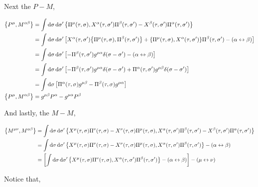 Next the $P-M$,

\begin{align*}
    \acomm{P^\mu}{M^{\alpha\beta}}&=\int\dd{\sigma}\dd{\sigma'}\acomm{\Pi^\mu\qty(\tau,\sigma)}{X^\alpha\qty(\tau,\sigma')\Pi^\beta\qty(\tau,\sigma')-X^\beta\qty(\tau,\sigma')\Pi^\alpha\qty(\tau,\sigma')}\\
    &=\int\dd{\sigma}\dd{\sigma'}\qty[X^\alpha\qty(\tau,\sigma')\acomm{\Pi^\mu\qty(\tau,\sigma)}{\Pi^\beta\qty(\tau,\sigma')}+\acomm{\Pi^\mu\qty(\tau,\sigma)}{X^\alpha\qty(\tau,\sigma')}\Pi^\beta\qty(\tau,\sigma')-\qty(\alpha\leftrightarrow\beta)]\\
    &=\int\dd{\sigma}\dd{\sigma'}\qty[-\Pi^\beta\qty(\tau,\sigma')g^{\mu\alpha}\delta\qty(\sigma-\sigma')-\qty(\alpha\leftrightarrow\beta)]\\
    &=\int\dd{\sigma}\dd{\sigma'}\qty[-\Pi^\beta\qty(\tau,\sigma')g^{\mu\alpha}\delta\qty(\sigma-\sigma')+\Pi^\alpha\qty(\tau,\sigma')g^{\mu\beta}\delta\qty(\sigma-\sigma')]\\
    &=\int\dd{\sigma}\qty[\Pi^\alpha\qty(\tau,\sigma)g^{\mu\beta}-\Pi^\beta\qty(\tau,\sigma)g^{\mu\alpha}]\\
    \acomm{P^\mu}{M^{\alpha\beta}}&=g^{\mu\beta}P^\alpha -g^{\mu\alpha}P^\beta 
\end{align*}

And lastly, the $M-M$,

\begin{align*}
    \acomm{M^{\mu\nu}}{M^{\alpha\beta}}&=\int\dd{\sigma}\dd{\sigma'}\acomm{X^\mu\qty(\tau,\sigma)\Pi^\nu\qty(\tau,\sigma)-X^\nu\qty(\tau,\sigma)\Pi^\mu\qty(\tau,\sigma)}{X^\alpha\qty(\tau,\sigma')\Pi^\beta\qty(\tau,\sigma')-X^\beta\qty(\tau,\sigma')\Pi^\alpha\qty(\tau,\sigma')}\\
    &=\int\dd{\sigma}\dd{\sigma'}\acomm{X^\mu\qty(\tau,\sigma)\Pi^\nu\qty(\tau,\sigma)-X^\nu\qty(\tau,\sigma)\Pi^\mu\qty(\tau,\sigma)}{X^\alpha\qty(\tau,\sigma')\Pi^\beta\qty(\tau,\sigma')}-\qty(\alpha\leftrightarrow\beta)\\
    &=\qty[\int\dd{\sigma}\dd{\sigma'}\acomm{X^\mu\qty(\tau,\sigma)\Pi^\nu\qty(\tau,\sigma)}{X^\alpha\qty(\tau,\sigma')\Pi^\beta\qty(\tau,\sigma')}-\qty(\alpha\leftrightarrow\beta)]-\qty(\mu\leftrightarrow\nu)
\end{align*}

Notice that,

